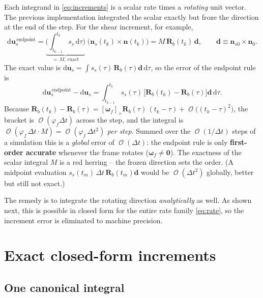 \documentclass[11pt]{article}
\newcommand{\dd}{\,\mathrm{d}}
\newcommand{\Rb}{\mathbf{R}_b}
\newcommand{\bwf}{\boldsymbol{\omega}_f}
\newcommand{\Dt}{\Delta t}
\DeclareMathOperator{\Oo}{\mathcal{O}}
\begin{document}
Each integrand in \eqref{eq:increments} is a scalar rate times a \emph{rotating} unit
vector. The previous implementation integrated the scalar exactly but froze the direction
at the end of the step. For the shear increment, for example,
\begin{equation}
  \mathrm{d}\mathbf{u}_s^{\,\mathrm{endpoint}}
   = \underbrace{\Big(\!\int_{t_{k-1}}^{t_k}\! s_s\dd\tau\Big)}_{=\,M,\ \text{exact}}
     \;\big(\mathbf{n}_s(t_k)\times\mathbf{n}(t_k)\big)
   = M\,\Rb(t_k)\,\mathbf{d},
   \qquad \mathbf{d}\equiv \mathbf{n}_{s0}\times\mathbf{n}_0 .
\end{equation}
The exact value is $\mathrm{d}\mathbf{u}_s=\int s_s(\tau)\,\Rb(\tau)\mathbf{d}\dd\tau$, so the
error of the endpoint rule is
\begin{equation}
  \mathrm{d}\mathbf{u}_s^{\,\mathrm{endpoint}}-\mathrm{d}\mathbf{u}_s
  = \int_{t_{k-1}}^{t_k}\! s_s(\tau)\,\big[\Rb(t_k)-\Rb(\tau)\big]\mathbf{d}\dd\tau .
\end{equation}
Because $\Rb(t_k)-\Rb(\tau)=[\bwf]_\times\Rb(\tau)\,(t_k-\tau)+\Oo\!\big((t_k-\tau)^2\big)$,
the bracket is $\Oo(\varphi_f\Dt)$ across the step, and the integral is
$\Oo(\varphi_f\,\Dt\cdot M)=\Oo(\varphi_f\,\Dt^2)$ \emph{per step}. Summed over the
$\Oo(1/\Dt)$ steps of a simulation this is a \emph{global} error of $\Oo(\Dt)$: the
endpoint rule is only \textbf{first-order accurate} whenever the frame rotates
($\bwf\neq\mathbf 0$). The exactness of the scalar integral $M$ is a red herring -- the
frozen direction sets the order. (A midpoint evaluation $s_s(t_m)\,\Dt\,\Rb(t_m)\mathbf{d}$
would be $\Oo(\Dt^2)$ globally, better but still not exact.)

The remedy is to integrate the rotating direction \emph{analytically} as well. As shown
next, this is possible in closed form for the entire rate family \eqref{eq:rate}, so the
increment error is eliminated to machine precision.

\section{Exact closed-form increments}
\label{sec:increments}

\subsection{One canonical integral}
\end{document}
